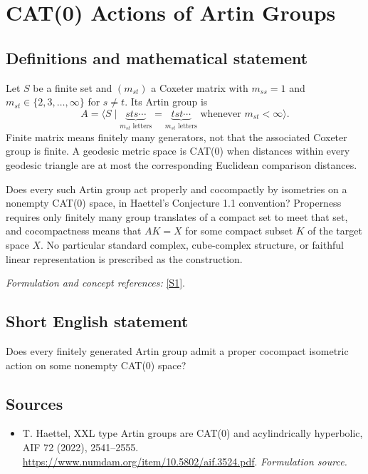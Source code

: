 \documentclass[11pt]{article}
\begin{document}
\section*{\texorpdfstring{CAT(0) Actions of Artin Groups}{CAT(0) Actions of Artin Groups}}\label{30002538}
\subsection{Definitions and mathematical statement}
Let $S$ be a finite set and $(m_{st})$ a Coxeter matrix with $m_{ss}=1$ and $m_{st}\in\{2,3,\ldots,\infty\}$ for $s\ne t$. Its Artin group is
\[
 A=\langle S\mid
 \underbrace{sts\cdots}_{m_{st}\text{ letters}}=
 \underbrace{tst\cdots}_{m_{st}\text{ letters}}
 \text{ whenever }m_{st}<\infty\rangle.
\]
Finite matrix means finitely many generators, not that the associated Coxeter group is finite. A geodesic metric space is CAT(0) when distances within every geodesic triangle are at most the corresponding Euclidean comparison distances.

Does every such Artin group act properly and cocompactly by isometries on a nonempty CAT(0) space, in Haettel's Conjecture 1.1 convention? Properness requires only finitely many group translates of a compact set to meet that set, and cocompactness means that $AK=X$ for some compact subset $K$ of the target space $X$. No particular standard complex, cube-complex structure, or faithful linear representation is prescribed as the construction.
\par\smallskip\textit{Formulation and concept references:} \href{https://www.numdam.org/item/10.5802/aif.3524.pdf}{[S1]}.

\subsection{Short English statement}
Does every finitely generated Artin group admit a proper cocompact isometric action on some nonempty CAT(0) space?
\subsection{Sources}
\begin{itemize}
\item[S1]T. Haettel, XXL type Artin groups are CAT(0) and acylindrically hyperbolic, AIF 72 (2022), 2541–2555.
\url{https://www.numdam.org/item/10.5802/aif.3524.pdf}.
\textit{Formulation source.}
\end{itemize}
\end{document}

